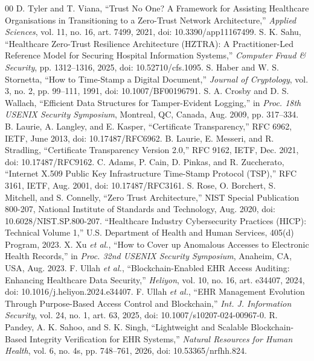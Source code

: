 \documentclass[conference]{IEEEtran}
\begin{document}
\begin{thebibliography}{00}
\scriptsize
\setlength{\itemsep}{0pt plus 0.2pt}
\setlength{\parsep}{0pt}
 D. Tyler and T. Viana, ``Trust No One? A Framework for Assisting Healthcare Organisations in Transitioning to a Zero-Trust Network Architecture,'' \emph{Applied Sciences}, vol. 11, no. 16, art. 7499, 2021, doi: 10.3390/app11167499.
 S. K. Sahu, ``Healthcare Zero-Trust Resilience Architecture (HZTRA): A Practitioner-Led Reference Model for Securing Hospital Information Systems,'' \emph{Computer Fraud \& Security}, pp. 1312--1316, 2025, doi: 10.52710/cfs.1095.
 S. Haber and W. S. Stornetta, ``How to Time-Stamp a Digital Document,'' \emph{Journal of Cryptology}, vol. 3, no. 2, pp. 99--111, 1991, doi: 10.1007/BF00196791.
 S. A. Crosby and D. S. Wallach, ``Efficient Data Structures for Tamper-Evident Logging,'' in \emph{Proc. 18th USENIX Security Symposium}, Montreal, QC, Canada, Aug. 2009, pp. 317--334.
 B. Laurie, A. Langley, and E. Kasper, ``Certificate Transparency,'' RFC 6962, IETF, June 2013, doi: 10.17487/RFC6962.
 B. Laurie, E. Messeri, and R. Stradling, ``Certificate Transparency Version 2.0,'' RFC 9162, IETF, Dec. 2021, doi: 10.17487/RFC9162.
 C. Adams, P. Cain, D. Pinkas, and R. Zuccherato, ``Internet X.509 Public Key Infrastructure Time-Stamp Protocol (TSP),'' RFC 3161, IETF, Aug. 2001, doi: 10.17487/RFC3161.
 S. Rose, O. Borchert, S. Mitchell, and S. Connelly, ``Zero Trust Architecture,'' NIST Special Publication 800-207, National Institute of Standards and Technology, Aug. 2020, doi: 10.6028/NIST.SP.800-207.
 ``Healthcare Industry Cybersecurity Practices (HICP): Technical Volume 1,'' U.S. Department of Health and Human Services, 405(d) Program, 2023.
 X. Xu \emph{et al.}, ``How to Cover up Anomalous Accesses to Electronic Health Records,'' in \emph{Proc. 32nd USENIX Security Symposium}, Anaheim, CA, USA, Aug. 2023.
 F. Ullah \emph{et al.}, ``Blockchain-Enabled EHR Access Auditing: Enhancing Healthcare Data Security,'' \emph{Heliyon}, vol. 10, no. 16, art. e34407, 2024, doi: 10.1016/j.heliyon.2024.e34407.
 F. Ullah \emph{et al.}, ``EHR Management Evolution Through Purpose-Based Access Control and Blockchain,'' \emph{Int. J. Information Security}, vol. 24, no. 1, art. 63, 2025, doi: 10.1007/s10207-024-00967-0.
 R. Pandey, A. K. Sahoo, and S. K. Singh, ``Lightweight and Scalable Blockchain-Based Integrity Verification for EHR Systems,'' \emph{Natural Resources for Human Health}, vol. 6, no. 4s, pp. 748--761, 2026, doi: 10.53365/nrfhh.824.

\end{thebibliography}
\end{document}
